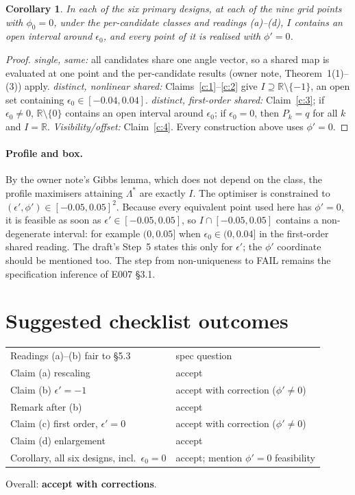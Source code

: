 \documentclass[11pt,a4paper]{article}
\newtheorem{corollary}[theorem]{Corollary}
\theoremstyle{remark}
\newcommand{\R}{\mathbb{R}}
\newcommand{\eps}{\epsilon}
\begin{document}
\begin{corollary}
In each of the six primary designs, at each of the nine grid points with $\phi_0=0$,
under the per-candidate classes and readings (a)--(d), $I$ contains an open interval around
$\eps_0$, and every point of it is realised with $\phi'=0$.
\end{corollary}
\begin{proof}
\emph{single, same:} all candidates share one angle vector, so a shared map is evaluated at
one point and the per-candidate results (owner note, Theorem~1(1)--(3)) apply.
\emph{distinct, nonlinear shared:} Claims~\ref{c:1}--\ref{c:2} give
$I\supseteq\R\setminus\{-1\}$, an open set containing $\eps_0\in[-0.04,0.04]$.
\emph{distinct, first-order shared:} Claim~\ref{c:3}; if $\eps_0\neq0$,
$\R\setminus\{0\}$ contains an open interval around $\eps_0$; if $\eps_0=0$, then
$P_k=q$ for all $k$ and $I=\R$. \emph{Visibility/offset:} Claim~\ref{c:4}. Every
construction above uses $\phi'=0$.
\end{proof}

\paragraph{Profile and box.} By the owner note's Gibbs lemma, which does not depend on the
class, the profile maximisers attaining $\Lambda^*$ are exactly $I$. The optimiser is
constrained to $(\eps',\phi')\in[-0.05,0.05]^2$. Because every equivalent point used here has
$\phi'=0$, it is feasible as soon as $\eps'\in[-0.05,0.05]$, so $I\cap[-0.05,0.05]$
contains a non-degenerate interval: for example $(0,0.05]$ when $\eps_0\in(0,0.04]$ in the
first-order shared reading. The draft's Step~5 states this only for $\eps'$; the $\phi'$
coordinate should be mentioned too. The step from non-uniqueness to FAIL remains the
specification inference of E007 §3.1.

\section*{Suggested checklist outcomes}
\begin{tabular}{@{}p{}p{}@{}}
\toprule
Readings (a)--(b) fair to §5.3 & spec question\\
Claim (a) rescaling & accept\\
Claim (b) $\eps'=-1$ & accept with correction ($\phi'\neq0$)\\
Remark after (b) & accept\\
Claim (c) first order, $\eps'=0$ & accept with correction ($\phi'\neq0$)\\
Claim (d) enlargement & accept\\
Corollary, all six designs, incl.\ $\eps_0=0$ & accept; mention $\phi'=0$ feasibility\\
\bottomrule
\end{tabular}

\medskip\noindent Overall: \textbf{accept with corrections}.
\end{document}
